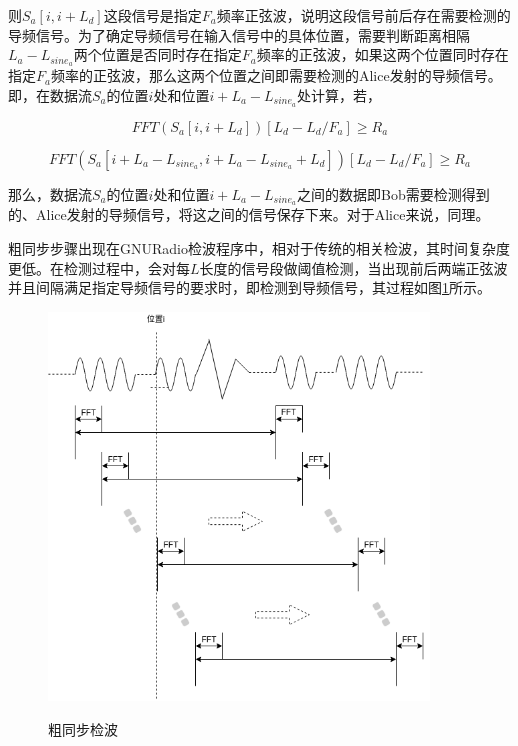 \documentclass[master]{seuthesis} %
\begin{document}
\begin{Main}
则$S_a[i, i+L_d]$这段信号是指定$F_a$频率正弦波，说明这段信号前后存在需要检测的导频信号。为了确定导频信号在输入信号中的具体位置，需要判断距离相隔$L_a - L_{sine_a}$两个位置是否同时存在指定$F_a$频率的正弦波，如果这两个位置同时存在指定$F_a$频率的正弦波，那么这两个位置之间即需要检测的Alice发射的导频信号。即，在数据流$S_a$的位置$i$处和位置$i+L_a-L_{sine_a}$处计算，若，

\begin{equation}
    FFT(S_a[i, i+L_d])[L_d - L_d / F_a] \geq R_a 
\end{equation}

\begin{equation}
    FFT(S_a[i+L_a-L_{sine_a}, i+L_a-L_{sine_a}+L_d])[L_d - L_d / F_a] \geq R_a 
\end{equation}

那么，数据流$S_a$的位置$i$处和位置$i+L_a-L_{sine_a}$之间的数据即Bob需要检测得到的、Alice发射的导频信号，将这之间的信号保存下来。对于Alice来说，同理。

粗同步步骤出现在GNURadio检波程序中，相对于传统的相关检波，其时间复杂度更低。在检测过程中，会对每$L$长度的信号段做阈值检测，当出现前后两端正弦波并且间隔满足指定导频信号的要求时，即检测到导频信号，其过程如图\ref{detect_wave_algm}所示。

\begin{figure}
    \centering
    \includegraphics[width=0.9\textwidth]{images/detect_wave_algm}
    \caption{粗同步检波}{} %
    \label{detect_wave_algm}
\end{figure}



\end{Main}
\end{document}
